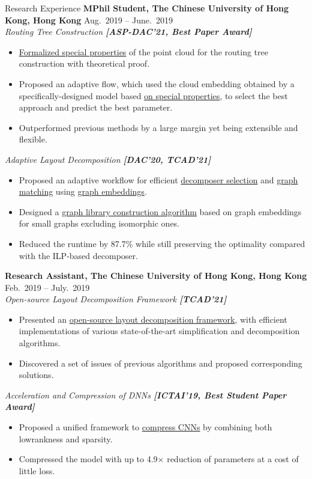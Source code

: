 \begin{rSection}{Research Experience}
{\bf MPhil Student, The Chinese University of Hong Kong, Hong Kong}               \hfill { Aug.~2019 -- June.~2019} \\
\textit{Routing Tree Construction \textbf{[{ASP-DAC'21, Best Paper Award}]}}
\begin{itemize}[noitemsep,topsep=-5pt]
    \item \underline{Formalized special properties} of the point cloud for the routing tree construction with theoretical proof.
    \item Proposed an adaptive flow, which used the cloud embedding obtained by a {specifically-designed model based} \underline{on special properties}, to select the best approach and predict the best parameter.
    \item Outperformed previous methods by a large margin yet being extensible and flexible.
\end{itemize}
\textit{Adaptive Layout Decomposition \textbf{[{DAC'20, TCAD'21}]}}
\begin{itemize}[noitemsep,topsep=-5pt]
    \item Proposed an adaptive workflow for efficient \underline{decomposer selection} and \underline{graph matching} using \underline{graph embeddings}.
    \item Designed a \underline{graph library construction algorithm} based on graph embeddings for small graphs excluding isomorphic ones.
    \item Reduced the runtime by 87.7\% while still preserving the optimality compared with the ILP-based decomposer.\\
\end{itemize}

{\bf Research Assistant, The Chinese University of Hong Kong, Hong Kong}               \hfill { Feb.~2019 -- July.~2019} \\
\textit{Open-source Layout Decomposition Framework \textbf{[{TCAD'21}]}}
\begin{itemize}[noitemsep,topsep=-5pt]
    \item Presented an \underline{open-source layout decomposition framework}, with efficient implementations of various state-of-the-art simplification and decomposition algorithms.
    \item Discovered a set of issues of previous algorithms and proposed corresponding solutions.
\end{itemize}
\textit{Acceleration and Compression of DNNs \textbf{[{ICTAI'19, Best Student Paper Award}]}}
\begin{itemize}[noitemsep,topsep=-5pt]
    \item Proposed a unified framework to \underline{compress CNNs} by combining both lowrankness and sparsity.
    \item Compressed the model with up to 4.9$\times$ reduction of parameters at a cost of little loss.\\
\end{itemize}


\end{rSection}
